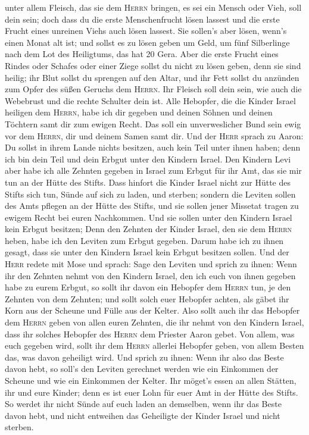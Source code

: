 unter allem Fleisch, das sie dem \textsc{Herrn} bringen, es sei ein
Mensch oder Vieh, soll dein sein; doch dass du die erste Menschenfrucht
lösen lassest und die erste Frucht eines unreinen Viehs auch lösen
lassest.  Sie sollen's aber lösen, wenn's einen Monat alt
ist; und sollst es zu lösen geben um Geld, um fünf Silberlinge nach dem
Lot des Heiligtums, das hat 20 Gera.  Aber die erste
Frucht eines Rindes oder Schafes oder einer Ziege sollst du nicht zu
lösen geben, denn sie sind heilig; ihr Blut sollst du sprengen auf den
Altar, und ihr Fett sollst du anzünden zum Opfer des süßen Geruchs dem
\textsc{Herrn}.  Ihr Fleisch soll dein sein, wie auch die
Webebrust und die rechte Schulter dein ist.  Alle
Hebopfer, die die Kinder Israel heiligen dem \textsc{Herrn}, habe ich
dir gegeben und deinen Söhnen und deinen Töchtern samt dir zum ewigen
Recht. Das soll ein unverweslicher Bund sein ewig vor dem
\textsc{Herrn}, dir und deinem Samen samt dir.  Und der
\textsc{Herr} sprach zu Aaron: Du sollst in ihrem Lande nichts besitzen,
auch kein Teil unter ihnen haben; denn ich bin dein Teil und dein Erbgut
unter den Kindern Israel.  Den Kindern Levi aber habe ich
alle Zehnten gegeben in Israel zum Erbgut für ihr Amt, das sie mir tun
an der Hütte des Stifts.  Dass hinfort die Kinder Israel
nicht zur Hütte des Stifts sich tun, Sünde auf sich zu laden, und
sterben;  sondern die Leviten sollen des Amts pflegen an
der Hütte des Stifts, und sie sollen jener Missetat tragen zu ewigem
Recht bei euren Nachkommen. Und sie sollen unter den Kindern Israel kein
Erbgut besitzen;  Denn den Zehnten der Kinder Israel, den
sie dem \textsc{Herrn} heben, habe ich den Leviten zum Erbgut gegeben.
Darum habe ich zu ihnen gesagt, dass sie unter den Kindern Israel kein
Erbgut besitzen sollen.  Und der \textsc{Herr} redete mit
Mose und sprach:  Sage den Leviten und sprich zu ihnen:
Wenn ihr den Zehnten nehmt von den Kindern Israel, den ich euch von
ihnen gegeben habe zu eurem Erbgut, so sollt ihr davon ein Hebopfer dem
\textsc{Herrn} tun, je den Zehnten von dem Zehnten;  und
sollt solch euer Hebopfer achten, als gäbet ihr Korn aus der Scheune und
Fülle aus der Kelter.  Also sollt auch ihr das Hebopfer
dem \textsc{Herrn} geben von allen euren Zehnten, die ihr nehmt von den
Kindern Israel, dass ihr solches Hebopfer des \textsc{Herrn} dem
Priester Aaron gebet.  Von allem, was euch gegeben wird,
sollt ihr dem \textsc{Herrn} allerlei Hebopfer geben, von allem Besten
das, was davon geheiligt wird.  Und sprich zu ihnen: Wenn
ihr also das Beste davon hebt, so soll's den Leviten gerechnet werden
wie ein Einkommen der Scheune und wie ein Einkommen der Kelter.
 Ihr möget's essen an allen Stätten, ihr und eure Kinder;
denn es ist euer Lohn für euer Amt in der Hütte des Stifts.
 So werdet ihr nicht Sünde auf euch laden an demselben,
wenn ihr das Beste davon hebt, und nicht entweihen das Geheiligte der
Kinder Israel und nicht sterben.


